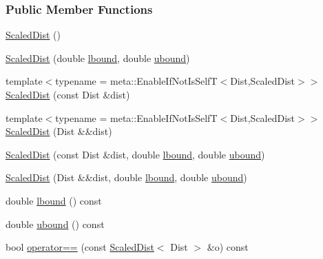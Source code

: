 \subsubsection*{Public Member Functions}
\begin{DoxyCompactItemize}
\item 
\hyperlink{classprior__hessian_1_1ScaledDist_a55511526153fb21ef8f57b9977d9b14c}{Scaled\+Dist} ()
\item 
\hyperlink{classprior__hessian_1_1ScaledDist_a00102b4332ba97aa1a0cff7a3c02e151}{Scaled\+Dist} (double \hyperlink{classprior__hessian_1_1ScaledDist_a46bce2de3c0e030e9e4542195ecb429f}{lbound}, double \hyperlink{classprior__hessian_1_1ScaledDist_a70c8013325f5b8709be0900dba6e9eda}{ubound})
\item 
{\footnotesize template$<$typename  = meta\+::\+Enable\+If\+Not\+Is\+Self\+T$<$\+Dist,\+Scaled\+Dist$>$$>$ }\\\hyperlink{classprior__hessian_1_1ScaledDist_aae30372ea4c0b21a958bd662177f763a}{Scaled\+Dist} (const Dist \&dist)
\item 
{\footnotesize template$<$typename  = meta\+::\+Enable\+If\+Not\+Is\+Self\+T$<$\+Dist,\+Scaled\+Dist$>$$>$ }\\\hyperlink{classprior__hessian_1_1ScaledDist_a07d95cd0e21a32d39521aad462122533}{Scaled\+Dist} (Dist \&\&dist)
\item 
\hyperlink{classprior__hessian_1_1ScaledDist_adcee5624ff0434c1cf9dcbeee4b66a85}{Scaled\+Dist} (const Dist \&dist, double \hyperlink{classprior__hessian_1_1ScaledDist_a46bce2de3c0e030e9e4542195ecb429f}{lbound}, double \hyperlink{classprior__hessian_1_1ScaledDist_a70c8013325f5b8709be0900dba6e9eda}{ubound})
\item 
\hyperlink{classprior__hessian_1_1ScaledDist_a88f6ac9f5ce7190f3664486170a37c12}{Scaled\+Dist} (Dist \&\&dist, double \hyperlink{classprior__hessian_1_1ScaledDist_a46bce2de3c0e030e9e4542195ecb429f}{lbound}, double \hyperlink{classprior__hessian_1_1ScaledDist_a70c8013325f5b8709be0900dba6e9eda}{ubound})
\item 
double \hyperlink{classprior__hessian_1_1ScaledDist_a46bce2de3c0e030e9e4542195ecb429f}{lbound} () const 
\item 
double \hyperlink{classprior__hessian_1_1ScaledDist_a70c8013325f5b8709be0900dba6e9eda}{ubound} () const 
\item 
bool \hyperlink{classprior__hessian_1_1ScaledDist_a99b90aa0517d8c85734e9891209f54f3}{operator==} (const \hyperlink{classprior__hessian_1_1ScaledDist}{Scaled\+Dist}$<$ Dist $>$ \&o) const 

\end{DoxyCompactItemize}

